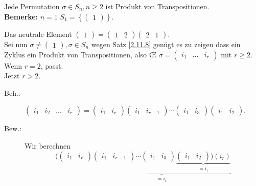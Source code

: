 \begin{subtheorem}
	Jede Permutation $ \sigma \in S_n , n \geq 2$ ist Produkt von Transpositionen.\\
	\textbf{Bemerke:} $ n = 1 $ $ S_1 = \left\{ \begin{pmatrix} 1 \end{pmatrix}  \right\}  $.
\end{subtheorem}
\begin{subproof*}
	Das neutrale Element $ \begin{pmatrix} 1 \end{pmatrix} = \begin{pmatrix} 1 & 2 \end{pmatrix} \begin{pmatrix} 2 & 1 \end{pmatrix}  $.\\
	Sei nun $ \sigma \neq \begin{pmatrix} 1 \end{pmatrix} , \sigma \in S_n $ wegen Satz \ref{2.11.8} genügt es zu zeigen dass ein Zyklus ein Produkt von Transpositionen, also \OE{} $ \sigma = \begin{pmatrix} i_1 & \hdots & i_r \end{pmatrix}  $ mit $ r \geq 2 $.\\
	Wenn $ r = 2 $, passt.\\
	Jetzt $ r > 2 $.
	\begin{description}
		\item[Beh.:] $ \begin{pmatrix} i_1 & i_2 & \hdots & i_r \end{pmatrix} = \begin{pmatrix} i_1 & i_r \end{pmatrix} \begin{pmatrix} i_1 & i_{r - 1}   \end{pmatrix} \dotsb \begin{pmatrix} i_1 & i_3 \end{pmatrix} \begin{pmatrix} i_1 & i_2 \end{pmatrix}  $.
		\item[Bew.:] Wir berechnen
			\[
				\Big(\begin{pmatrix} i_1 & i_r \end{pmatrix} \underbrace{\begin{pmatrix} i_1 & i_{r - 1}  \end{pmatrix} \dotsb \begin{pmatrix} i_1 & i_3 \end{pmatrix} \underbrace{\begin{pmatrix} i_1 & i_2 \end{pmatrix}\Big)(i_r)}_{=i_r}}_{=i_r}
\]
\end{description}
\end{subproof*}
